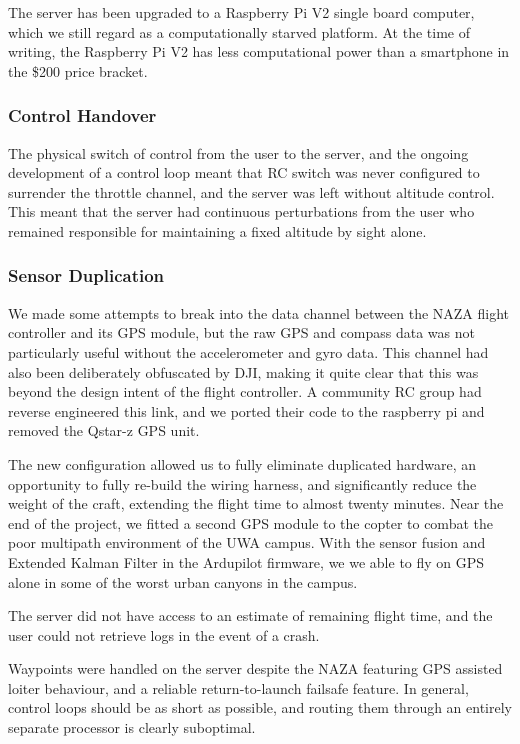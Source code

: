 \documentclass{article}
\begin{document}
    The server has been upgraded to a Raspberry Pi V2 single board computer, which we still regard as a computationally starved platform.  At the time of writing, the Raspberry Pi V2 has less computational power than a smartphone in the \$200 price bracket.
    \subsubsection{Control Handover}
      The physical switch of control from the user to the server, and the ongoing development of a control loop meant that RC switch was never configured to surrender the throttle channel, and the server was left without altitude control.  This meant that the server had continuous perturbations from the user who remained responsible for maintaining a fixed altitude by sight alone.


    \subsubsection{Sensor Duplication}


      We made some attempts to break into the data channel between the NAZA flight controller and its GPS module, but the raw GPS and compass data was not particularly useful without the accelerometer and gyro data.  This channel had also been deliberately obfuscated by DJI, making it quite clear that this was beyond the design intent of the flight controller.  A community RC group had reverse engineered this link, and we ported their code to the raspberry pi and removed the Qstar-z GPS unit.
      
      The new configuration allowed us to fully eliminate duplicated hardware, an opportunity to fully re-build the wiring harness, and significantly reduce the weight of the craft, extending the flight time to almost twenty minutes.
      Near the end of the project, we fitted a second GPS module to the copter to combat the poor multipath environment of the UWA campus.  With the sensor fusion and Extended Kalman Filter in the Ardupilot firmware, we we able to fly on GPS alone in some of the worst urban canyons in the campus.


      The server did not have access to an estimate of remaining flight time, and the user could not retrieve logs in the event of a crash.

      Waypoints were handled on the server despite the NAZA featuring GPS assisted loiter behaviour, and a reliable return-to-launch failsafe feature.  In general, control loops should be as short as possible, and routing them through an entirely separate processor is clearly suboptimal.
\end{document}
